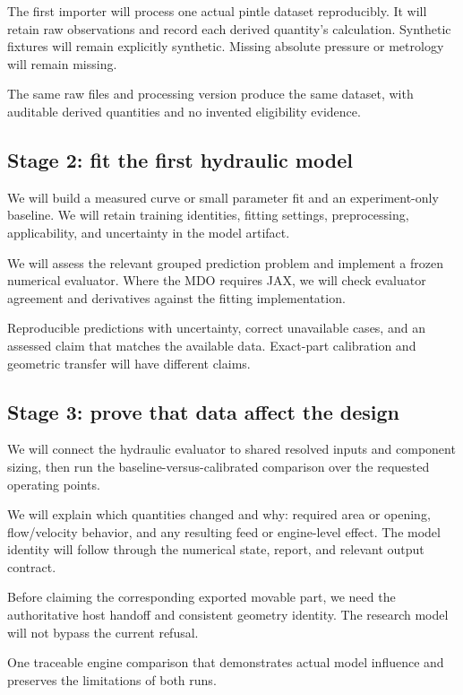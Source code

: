 The first importer will process one actual pintle dataset reproducibly. It will retain raw observations and record each derived quantity's calculation. Synthetic fixtures will remain explicitly synthetic. Missing absolute pressure or metrology will remain missing.

The same raw files and processing version produce the same dataset, with auditable derived quantities and no invented eligibility evidence.

\subsection{Stage 2: fit the first hydraulic model}

We will build a measured curve or small parameter fit and an experiment-only baseline. We will retain training identities, fitting settings, preprocessing, applicability, and uncertainty in the model artifact.

We will assess the relevant grouped prediction problem and implement a frozen numerical evaluator. Where the MDO requires JAX, we will check evaluator agreement and derivatives against the fitting implementation.

Reproducible predictions with uncertainty, correct unavailable cases, and an assessed claim that matches the available data. Exact-part calibration and geometric transfer will have different claims.

\subsection{Stage 3: prove that data affect the design}

We will connect the hydraulic evaluator to shared resolved inputs and component sizing, then run the baseline-versus-calibrated comparison over the requested operating points.

We will explain which quantities changed and why: required area or opening, flow/velocity behavior, and any resulting feed or engine-level effect. The model identity will follow through the numerical state, report, and relevant output contract.

\begin{samepage}
Before claiming the corresponding exported movable part, we need the authoritative host handoff and consistent geometry identity. The research model will not bypass the current refusal.

One traceable engine comparison that demonstrates actual model influence and preserves the limitations of both runs.
\end{samepage}

